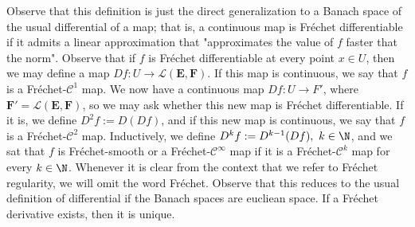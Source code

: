 Observe that this definition is just the direct generalization to a Banach space of the usual differential of a map; that is, a continuous map is Fréchet differentiable if it admits a linear approximation that "approximates the value of \(f\) faster that the norm". Observe that if \(f\) is Fréchet differentiable at every point \(x \in U\), then we may define a map \(Df\colon U \to \mathcal{L}(\mathbf{E},\mathbf{F})\). If this map is continuous, we say that \(f\) is a Fréchet-\(\mathscr{C}^1\) map. We now have a continuous map \(Df\colon U \to F'\), where \(\mathbf{F}'=\mathcal{L}(\mathbf{E},\mathbf{F})\), so we may ask whether this new map is Fréchet differentiable. If it is, we define \(D^2f:=D(Df)\), and if this new map is continuous, we say that \(f\) is a Fréchet-\(\mathscr{C}^2\) map. Inductively, we define \(D^kf:=D^{k-1}(Df), \ k \in \N\), and we sat that \(f\) is Fréchet-smooth or a Fréchet-\(\mathscr{C}^\infty\) map if it is a Fréchet-\(\mathscr{C}^k\) map for every \(k \in \N\). Whenever it is clear from the context that we refer to Fréchet regularity, we will omit the word Fréchet. Observe that this reduces to the usual definition of differential if the Banach spaces are eucliean space. If a Fréchet derivative exists, then it is unique.


